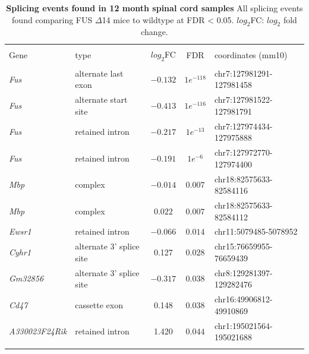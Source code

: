 \begin{table}[!htbp] 
	\centering 
	\caption[Splicing events found in 12 month spinal cord samples]{
		\textbf{Splicing events found in 12 month spinal cord samples}
	All splicing events found comparing FUS $\Delta$14 mice to wildtype at FDR < 0.05. 
	$log_2$FC: $log_2$ fold change.
	}
	\label{tab:fus_mouse_splicing} 
	\begin{tabular}{@{\extracolsep{5pt}} llccl} 
		\\[-1.8ex]\hline 
		\hline \\[-1.8ex] 
		Gene & type & $log_2$FC & FDR & coordinates (mm10)\\ 
		\hline \\[-1.8ex] 
		\textit{Fus} & alternate last exon & $-0.132$ & $1e^{-118}$ & chr7:127981291-127981458 \\ 
		\textit{Fus} & alternate start site & $-0.413$ & $1e^{-116}$ & chr7:127981522-127981791 \\ 
		\textit{Fus} & retained intron & $-0.217$ & $1e^{-13}$ & chr7:127974434-127975888 \\ 
		\textit{Fus} & retained intron & $-0.191$ & $1e^{-6}$ & chr7:127972770-127974400 \\ 
		\textit{Mbp} & complex  & $-0.014$ & $0.007$ & chr18:82575633-82584116 \\ 
		\textit{Mbp} & complex & $0.022$ & $0.007$ & chr18:82575633-82584112 \\ 
		 \textit{Ewsr1} & retained intron & $-0.066$ & $0.014$ & chr11:5079485-5078952 \\ 
		\textit{Cyhr1} & alternate 3' splice site & 0.127 & $0.028$ & chr15:76659955-76659439 \\ 
		\textit{Gm32856} & alternate 3' splice site & $-0.317$ & $0.038$ & chr8:129281397-129282476 \\ 
		\textit{Cd47} & cassette exon & 0.148 & $0.038$ & chr16:49906812-49910869 \\ 
		\textit{A330023F24Rik} & retained intron & 1.420 & $0.044$ & chr1:195021564-195021688 \\ 
		\hline \\[-1.8ex] 
	\end{tabular} 
\end{table} 



